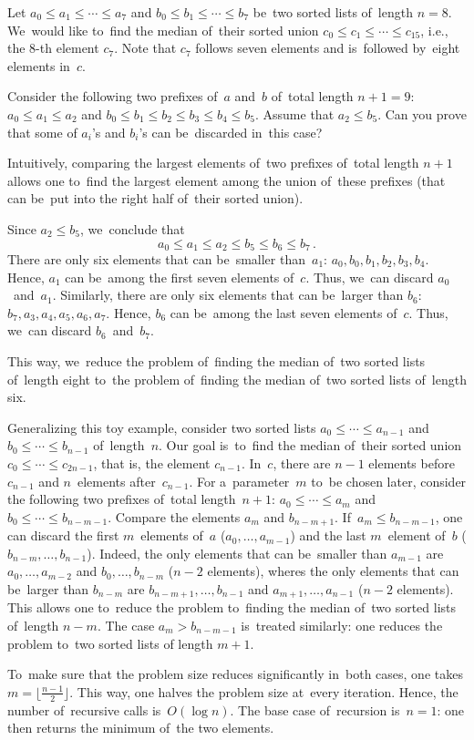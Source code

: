 \documentclass{article}
\begin{document}
Let $a_0 \le a_1 \le \dotsb \le a_7$ and $b_0 \le b_1 \le \dotsb \le b_7$
be~two sorted lists of~length $n=8$. We~would like to~find the median of~their sorted union $c_0 \le c_1 \le \dotsb \le c_{15}$,
i.e., the $8$-th element $c_7$. Note that $c_7$ follows seven elements and is~followed by~eight elements in~$c$.

Consider the following two prefixes of~$a$ and~$b$ of~total length $n+1=9$: $a_0 \le a_1 \le a_2$
and $b_0 \le b_1 \le b_2 \le b_3 \le b_4 \le b_5$. Assume that $a_2 \le b_5$. Can you prove that
some of $a_i$'s and $b_i$'s can be~discarded in~this case?

Intuitively, comparing the largest elements of~two prefixes of~total length $n+1$
allows one to~find the largest element among the union of~these prefixes
(that can be~put into the right half of~their sorted union).

Since $a_2 \le b_5$, we~conclude that
\[a_0 \le a_1 \le a_2 \le b_5 \le b_6 \le b_7 \, .\]
There are only six elements that can be~smaller than~$a_1$: $a_0, b_0, b_1, b_2, b_3, b_4$.
Hence, $a_1$ can be~among the first seven elements of~$c$. Thus, we~can discard 
$a_0$~and~$a_1$. Similarly, there are only six elements that can be~larger than $b_6$:
$b_7, a_3, a_4, a_5, a_6, a_7$. Hence, $b_6$ can be~among the last seven elements of~$c$.
Thus, we~can discard $b_6$~and~$b_7$.

This way, we~reduce the problem of~finding the median of~two sorted lists of~length eight
to~the problem of~finding the median of~two sorted lists of~length six.

Generalizing this toy example, consider two sorted lists $a_0 \le \dotsb \le a_{n-1}$ and $b_0 \le \dotsb \le b_{n-1}$ of~length~$n$. Our goal is~to~find the median of~their sorted union
$c_0 \le \dotsb \le c_{2n-1}$, that is, the element $c_{n-1}$. In~$c$, there are $n-1$ elements
before $c_{n-1}$ and $n$~elements after~$c_{n-1}$.
For a~parameter~$m$ to~be chosen later, consider the following two prefixes of~total length~$n+1$: $a_0 \le \dotsb \le a_m$ and $b_0 \le  \dotsb \le b_{n-m-1}$.
Compare the elements $a_m$ and $b_{n-m+1}$. 
If~$a_m \le b_{n-m-1}$,
	one can discard the first $m$~elements of~$a$ ($a_0, \dotsc, a_{m-1}$) 
	and the last $m$~element of~$b$ ($b_{n-m}, \dotsc, b_{n-1}$). Indeed, 
	the only elements that can be~smaller than $a_{m-1}$
	are $a_0, \dotsc, a_{m-2}$ and $b_0, \dotsc, b_{n-m}$ ($n-2$ elements),
	wheres the only elements that can be~larger than $b_{n-m}$
	are $b_{n-m+1}, \dotsc, b_{n-1}$ and $a_{m+1}, \dotsc, a_{n-1}$ ($n-2$ elements).
	This allows one to~reduce the problem to~finding the median of~two sorted lists of~length $n-m$.
The case $a_m > b_{n-m-1}$ is~treated similarly: one reduces the problem to~two sorted
lists of length $m+1$.

To~make sure that the problem size reduces significantly in~both cases, one takes $m=\lfloor \frac{n-1}{2} \rfloor$. This way, one halves the problem size at~every iteration. Hence, the number
of~recursive calls is~$O(\log n)$. The base case of~recursion is~$n=1$: one then returns the minimum of~the two elements. 
\end{document}
